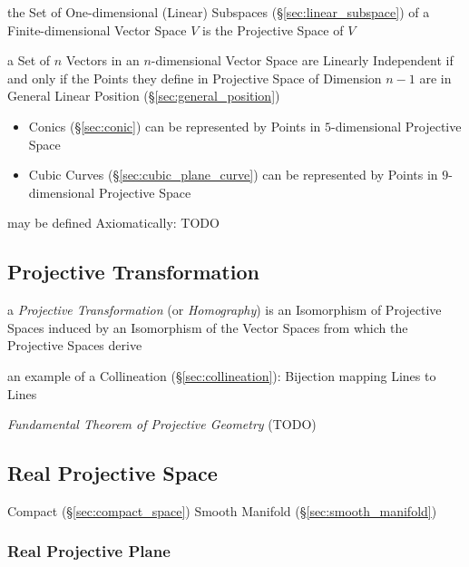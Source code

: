 the Set of One-dimensional (Linear) Subspaces (\S\ref{sec:linear_subspace}) of a
Finite-dimensional Vector Space $V$ is the Projective Space of $V$

a Set of $n$ Vectors in an $n$-dimensional Vector Space are Linearly
Independent if and only if the Points they define in Projective Space of
Dimension $n-1$ are in General Linear Position (\S\ref{sec:general_position})

\begin{itemize}
  \item Conics (\S\ref{sec:conic}) can be represented by Points in
    $5$-dimensional Projective Space
  \item Cubic Curves (\S\ref{sec:cubic_plane_curve}) can be represented by
    Points in $9$-dimensional Projective Space
\end{itemize}

may be defined Axiomatically: TODO



\subsection{Projective Transformation}\label{sec:projective_transformation}

a \emph{Projective Transformation} (or \emph{Homography}) is an Isomorphism of
Projective Spaces induced by an Isomorphism of the Vector Spaces from which the
Projective Spaces derive

an example of a Collineation (\S\ref{sec:collineation}): Bijection mapping Lines
to Lines

\emph{Fundamental Theorem of Projective Geometry} (TODO)



\subsection{Real Projective Space}\label{sec:real_projective_space}

Compact (\S\ref{sec:compact_space}) Smooth Manifold
(\S\ref{sec:smooth_manifold})



\subsubsection{Real Projective Plane}\label{sec:real_projective_plane}

